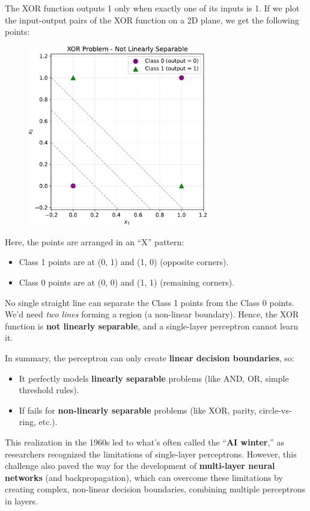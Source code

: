 \noindent
The XOR function outputs 1 only when exactly one of its inputs is 1. If we plot the input-output pairs of the XOR function on a 2D plane, we get the following points:

\begin{figure}[!htp]
    \centering
    \includegraphics[width=0.7\textwidth]{img/perceptron/xor.pdf}
\end{figure}

\noindent
Here, the points are arranged in an ``X'' pattern:
\begin{itemize}
    \item Class 1 points are at (0, 1) and (1, 0) (opposite corners).
    \item Class 0 points are at (0, 0) and (1, 1) (remaining corners).
\end{itemize}
No single straight line can separate the Class 1 points from the Class 0 points. We'd need \emph{two lines} forming a region (a non-linear boundary). Hence, the XOR function is \textbf{not linearly separable}, and a single-layer perceptron cannot learn it.

\newpage

\noindent
In summary, the perceptron can only create \textbf{linear decision boundaries}, so:
\begin{itemize}
    \item[\textcolor{Green3}{\faIcon{check-circle}}] It perfectly models \textbf{linearly separable} problems (like AND, OR, simple threshold rules).
    \item[\textcolor{Red3}{\faIcon{times-circle}}] If fails for \textbf{non-linearly separable} problems (like XOR, parity, circle-vs-ring, etc.).
\end{itemize}
This realization in the 1960s led to what's often called the ``\textbf{AI winter},'' as researchers recognized the limitations of single-layer perceptrons. However, this challenge also paved the way for the development of \textbf{multi-layer neural networks} (and backpropagation), which can overcome these limitations by creating complex, non-linear decision boundaries, combining multiple perceptrons in layers.